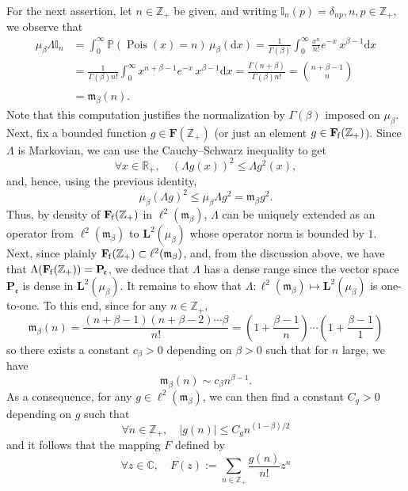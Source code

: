 \documentclass[10pt]{amsart}
\theoremstyle{definition}\newtheorem{defi}[theo]{Definition}\newtheorem{rema}[theo]{Remark}\newtheorem{exam}[theo]{Example}\newtheorem{exem}[theo]{Example}\newtheorem{nota}[theo]{Notation}
\DeclareMathOperator{\Pois}{Pois}
\newcommand{\df}{\mathrel{:=}}
\newcommand{\CC}{\mathbb{C}}
\newcommand{\PP}{\mathbb{P}}
\newcommand{\RR}{\mathbb{R}}
\newcommand{\ZZ}{\mathbb{Z}}
\newcommand{\fe}{\mathfrak{e}}
\newcommand{\fm}{\mathfrak{m}}
\newcommand{\iy}{\infty}
\newcommand{\lt}{\left}
\newcommand{\rt}{\right}
\newcommand{\lve}{\lt\vert}
\newcommand{\rve}{\rt\vert}
\newcommand{\esP}{\mathbf{P}}
\newcommand{\esL}{\mathbf{L}}
\newcommand{\esLd}{\ell}
\newcommand{\esF}{\mathbf{F}}
\newcommand{\esPe}{\esP_{\! \fe}}
\newcommand{\esFf}{\esF_{\hskip-.3mm\mathrm{f}}}
\let\oldforall\forall
\renewcommand*{\forall}{\mathrel{\oldforall}}
\newcommand*{\dd}{\mathrm{d}}
\newcommand*{\dx}{\dd x}
\begin{document}
For the next assertion, let $n\in\ZZ_+$ be given, and writing $\mathbb{I}_n(p)=\delta_{np}, n,p\in \ZZ_+,$ we observe that
\begin{align*}
\mu_{\beta}\Lambda \mathbb{I}_n&=\int_0^{\iy } \PP(\Pois(x)=n)\, \mu_{\beta}(\dx) =\frac1{\Gamma(\beta)}\int_0^{\iy } \frac{x^n}{n!}e^{-x} \, x^{\beta-1} \dx\\
&=\frac1{\Gamma(\beta)n!}\int_0^{\iy } x^{n+\beta-1}e^{-x} \, x^{\beta-1} \dx =\frac{\Gamma(n+\beta)}{\Gamma(\beta)n!} =\binom{n+\beta-1}{n}\\
&=\fm_{\beta}(n).\phantom{\int^l}
\end{align*}
Note that this computation justifies the normalization by $\Gamma(\beta)$ imposed on $\mu_{\beta}$. Next, fix a bounded function $g\in\esF(\ZZ_+)$ (or just an element $g\in\esFf(\ZZ_+)$). Since $\Lambda$ is Markovian, we can use the Cauchy--Schwarz inequality to get
\begin{equation}\label{csL}
\forall x\in\RR_+,\quad (\Lambda g(x))^2\leq \Lambda g^2(x),
\end{equation}
and, hence, using the previous identity,
\[
\mu_{\beta} (\Lambda g)^2\leq \mu_{\beta}\Lambda g^2 =\fm_{\beta} g^2.
\]
Thus, by density of $\esFf(\ZZ_+)$ in $\esLd^2(\fm_{\beta})$, $\Lambda$ can be uniquely extended as an operator from $\esLd^2(\fm_{\beta})$ to $\esL^2(\mu_{\beta})$ whose operator norm is bounded by $1$. Next, since plainly $\esFf(\ZZ_+) \subset \esLd^2(\fm_{\beta})$, and, from the discussion above, we have that $\Lambda (\esFf(\ZZ_+))=\esPe$, we deduce that $\Lambda$ has a dense range since the vector space $\esPe$ is dense in $\esL^2(\mu_{\beta})$. It remains to show that $\Lambda : \esLd^2(\fm_{\beta}) \mapsto \esL^2(\mu_{\beta})$ is one-to-one. To this end, since for any $n\in \ZZ_+,$
\begin{equation}\label{mbetan}
\fm_{\beta}(n)= \frac{(n+\beta-1)(n+\beta-2)\cdots \beta}{n!} =\lt(1+\frac{\beta-1}{n}\rt)\cdots \lt(1+\frac{\beta-1}{1}\rt)
\end{equation}
so there exists a constant $c_{\beta}>0$ depending on $\beta>0$ such that for $n$ large, we have
\[
\fm_{\beta}(n)\sim c_{\beta}n^{\beta-1}.
\]
As a consequence, for any $g\in\esLd^2(\fm_{\beta})$, we can then find a constant $C_g>0$ depending on $g$ such that
\[
\forall n\in\ZZ_+,\quad \lve g(n)\rve\leq C_g n^{(1-\beta)/2}
\]
and it follows that the mapping $F$ defined by
\begin{equation}\label{boundf}
\forall z\in \CC,\quad F(z)\df \sum_{n\in\ZZ_+} \frac{g(n)}{n!}z^n
\end{equation}
\end{document}
